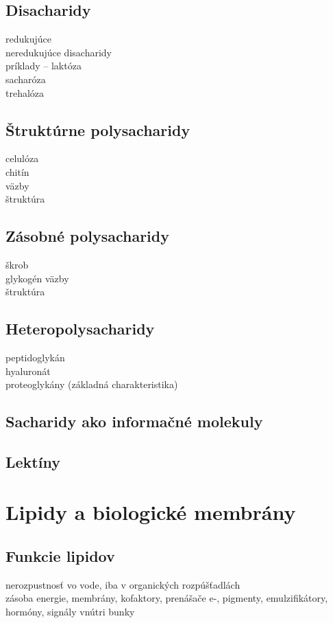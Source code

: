 \subsection*{Disacharidy}
\tab redukujúce\\
\tab neredukujúce disacharidy\\
\tab príklady -- laktóza\\
\tab sacharóza\\
\tab trehalóza\\
\subsection*{Štruktúrne polysacharidy}
\tab celulóza\\
\tab chitín\\
\tab \tab väzby\\
\tab \tab štruktúra\\
\subsection*{Zásobné polysacharidy}
\tab škrob\\
\tab glykogén
\tab \tab väzby\\
\tab \tab štruktúra\\
\subsection*{Heteropolysacharidy}
\tab peptidoglykán\\
\tab hyaluronát\\
\tab proteoglykány (základná charakteristika)\\
\subsection*{Sacharidy ako informačné molekuly}
\subsection*{Lektíny}

\section{Lipidy a biologické membrány}
\subsection*{Funkcie lipidov}
nerozpustnosť vo vode, iba v organických rozpúšťadlách\\
zásoba energie, membrány, kofaktory, prenášače e-, pigmenty, emulzifikátory, hormóny, signály vnútri bunky\\
